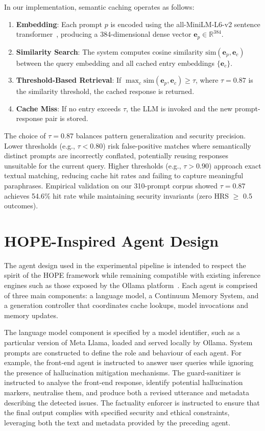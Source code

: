 \documentclass[11pt,a4paper]{article}
\begin{document}
	In our implementation, semantic caching operates as follows:
		\begin{enumerate}
			\item \textbf{Embedding}: Each prompt $p$ is encoded using the all-MiniLM-L6-v2 sentence transformer~\cite{reimers2019sentence}, producing a 384-dimensional dense vector $\mathbf{e}_p \in \mathbb{R}^{384}$.
			\item \textbf{Similarity Search}: The system computes cosine similarity $\text{sim}(\mathbf{e}_p, \mathbf{e}_c)$ between the query embedding and all cached entry embeddings $\{\mathbf{e}_c\}$.
			\item \textbf{Threshold-Based Retrieval}: If $\max_c \text{sim}(\mathbf{e}_p, \mathbf{e}_c) \geq \tau$, where $\tau = 0.87$ is the similarity threshold, the cached response is returned.
			\item \textbf{Cache Miss}: If no entry exceeds $\tau$, the LLM is invoked and the new prompt-response pair is stored.
	\end{enumerate}
	
	The choice of $\tau = 0.87$ balances pattern generalization and security precision. Lower thresholds (e.g., $\tau < 0.80$) risk false-positive matches where semantically distinct prompts are incorrectly conflated, potentially reusing responses unsuitable for the current query. Higher thresholds (e.g., $\tau > 0.90$) approach exact textual matching, reducing cache hit rates and failing to capture meaningful paraphrases. Empirical validation on our 310-prompt corpus showed $\tau = 0.87$ achieves 54.6\% hit rate while maintaining security invariants (zero HRS $\geq$ 0.5 outcomes).
	
	
	\section{HOPE-Inspired Agent Design}
	\label{sec:agent_design}
	
	The agent design used in the experimental pipeline is intended to respect the spirit of the HOPE framework while remaining compatible with existing inference engines such as those exposed by the Ollama platform~\cite{ollama2025}. Each agent is comprised of three main components: a language model, a Continuum Memory System, and a generation controller that coordinates cache lookups, model invocations and memory updates.
	
	The language model component is specified by a model identifier, such as a particular version of Meta Llama, loaded and served locally by Ollama. System prompts are constructed to define the role and behaviour of each agent. For example, the front-end agent is instructed to answer user queries while ignoring the presence of hallucination mitigation mechanisms. The guard-sanitizer is instructed to analyse the front-end response, identify potential hallucination markers, neutralise them, and produce both a revised utterance and metadata describing the detected issues. The factuality enforcer is instructed to ensure that the final output complies with specified security and ethical constraints, leveraging both the text and metadata provided by the preceding agent.
	
\end{document}
